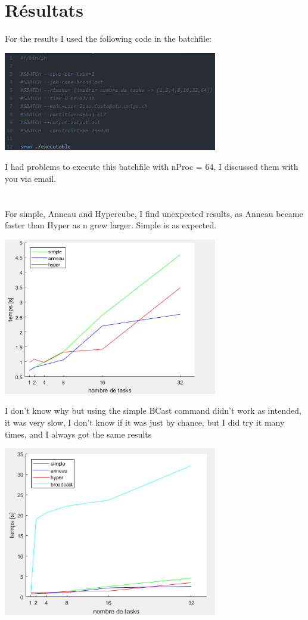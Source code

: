 \documentclass[a4paper]{article}
\begin{document}
\section*{Résultats}
For the results I used the following code in the batchfile:
\begin{center}
\includegraphics[width=0.7\textwidth]{images/batch.PNG}\\[1cm] 
\end{center}
I had problems to execute this batchfile with nProc = 64, I discussed them with you via email.\\\\\\

For simple, Anneau and Hypercube, I find unexpected results, as Anneau became faster than Hyper as n grew larger. Simple is as expected.

\begin{center}
\includegraphics[width=0.7\textwidth]{images/graph.PNG}\\[1cm] 
\end{center}


I don't know why but using the simple BCast command didn't work as intended, it was very slow, I don't know if it was just by chance, but I did try it many times, and I always got the same results

\begin{center}
\includegraphics[width=0.7\textwidth]{images/graph2.PNG}\\[1cm] 
\end{center}
\end{document}
